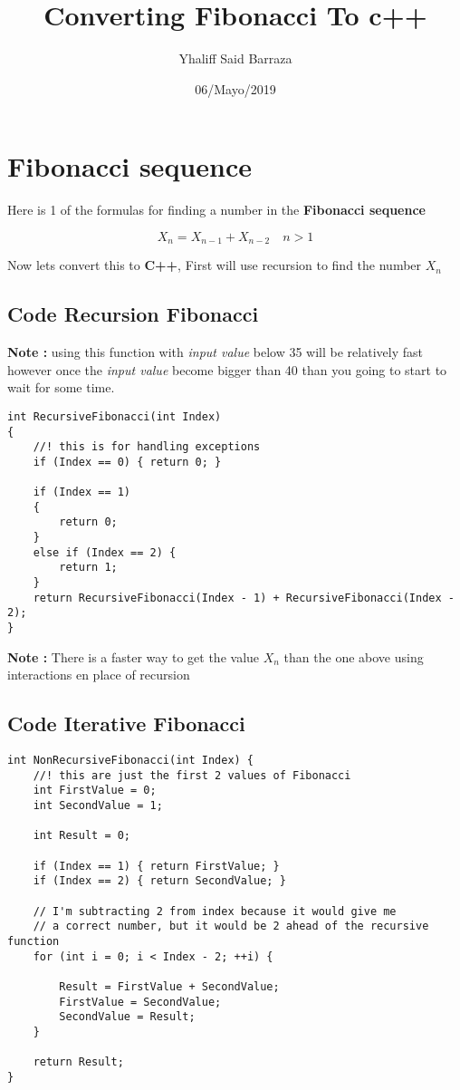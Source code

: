 \documentclass{article}
\author{Yhaliff Said Barraza}
\title{Converting Fibonacci To c++}
\date {06/Mayo/2019}
\begin{document}
\maketitle

\section{Fibonacci sequence}
Here is 1 of the formulas for finding a number in the \textbf{Fibonacci sequence}  

$$ X_n = X_{n-1} + X_{n-2 } \quad n > 1$$

Now lets convert this to \textbf{C++}, First will use recursion to find the number $X_n$


\subsection{Code Recursion Fibonacci}

\textbf{Note :} using this function with \textit{input value} below 35 will be relatively fast however once the \textit{input value} become bigger than 40 than you going to start to wait for some time.
\begin{lstlisting}
int RecursiveFibonacci(int Index)
{
	//! this is for handling exceptions
	if (Index == 0) { return 0; }

	if (Index == 1)
	{
		return 0;
	}
	else if (Index == 2) {
		return 1;
	}
	return RecursiveFibonacci(Index - 1) + RecursiveFibonacci(Index - 2);
}
\end{lstlisting}

\textbf{Note :} There is a faster way to get the value $X_n$ than the one above using interactions en place of recursion

\subsection{Code Iterative Fibonacci }

\begin{lstlisting} 
int NonRecursiveFibonacci(int Index) {
	//! this are just the first 2 values of Fibonacci
	int FirstValue = 0;
	int SecondValue = 1;

	int Result = 0;

	if (Index == 1) { return FirstValue; }
	if (Index == 2) { return SecondValue; }

	// I'm subtracting 2 from index because it would give me 
	// a correct number, but it would be 2 ahead of the recursive function
	for (int i = 0; i < Index - 2; ++i) {

		Result = FirstValue + SecondValue;
		FirstValue = SecondValue;
		SecondValue = Result;
	}

	return Result;
}
\end{lstlisting}
\end{document}
